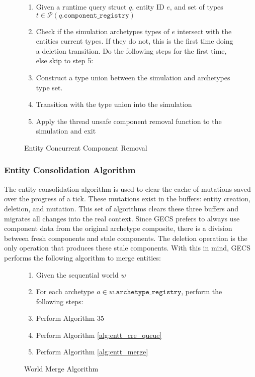 \begin{figure}[htbp]
    \begin{enumerate}
        \item Given a runtime query struct $q$, entity ID $e$, and set of types $t \in \mathcal{P}(q.\texttt{component\_registry})$
        \item Check if the simulation archetypes types of $e$ intersect with the entities current types. If they do not, this is the first time doing a deletion transition. Do the following steps for the first time, else skip to step 5:
        \item Construct a type union between the simulation and archetypes type set. 
        \item Transition with the type union into the simulation
        \item Apply the thread unsafe component removal function to the simulation and exit
\end{enumerate}
\caption{Entity Concurrent Component Removal}
\label{alg:conc_rem}
\end{figure}

\subsubsection{Entity Consolidation Algorithm}

The entity consolidation algorithm is used to clear the cache of mutations saved over the progress of a tick. These mutations exist in the buffers: entity creation, deletion, and mutation. This set of algorithms clears these three buffers and migrates all changes into the real context. Since GECS prefers to always use component data from the original archetype composite, there is a division between fresh components and stale components. The deletion operation is the only operation that produces these stale components. With this in mind, GECS performs the following algorithm to merge entities:

\begin{figure}[H]
    \begin{enumerate}
        \item Given the sequential world $w$
        \item For each archetype $a \in w.\texttt{archetype\_registry}$, perform the following steps:
        \item Perform Algorithm 35
        \item Perform Algorithm \ref{alg:entt_cre_queue}
        \item Perform Algorithm \ref{alg:entt_merge}
\end{enumerate}
\caption{World Merge Algorithm}
\label{alg:world_merge}
\end{figure}

